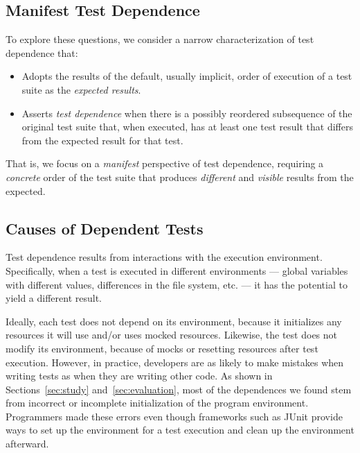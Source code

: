 \subsection{Manifest Test Dependence}

To explore these questions, we consider a narrow characterization
of test dependence that:
\begin{itemize}
\item Adopts the results of the default, usually implicit,
  order of execution of a test suite as the \emph{expected results}. 
\item Asserts \emph{test dependence} when there is a possibly
  reordered subsequence of the original test suite that, when
  executed, has at least one test result that differs from the
  expected result for that test.  
\end{itemize}
That is, we focus on a \emph{manifest} perspective of test dependence,
requiring a \emph{concrete} order of the test suite that
produces \emph{different} and \emph{visible} results from the expected.  


\subsection{Causes of Dependent Tests}


Test dependence results from interactions with the execution environment.
Specifically, when a
test is executed in different environments --- global variables
with different values, differences in the file system, etc. --- it has the
potential to yield
a different result.  

Ideally, each test does not depend on its environment, because it
initializes any resources it will use and/or uses mocked resources.
Likewise, the test does not modify its environment, because of mocks or
resetting resources after test execution. However, in practice,
developers are as likely
to make mistakes when writing tests as when they are writing other code.
As shown in Sections~\ref{sec:study} and~\ref{sec:evaluation}, most of the dependences we found
stem from incorrect or incomplete initialization
of the program environment.
Programmers made these errors even though frameworks such as
JUnit provide ways to set up the environment for a test execution and clean
up the environment afterward.



